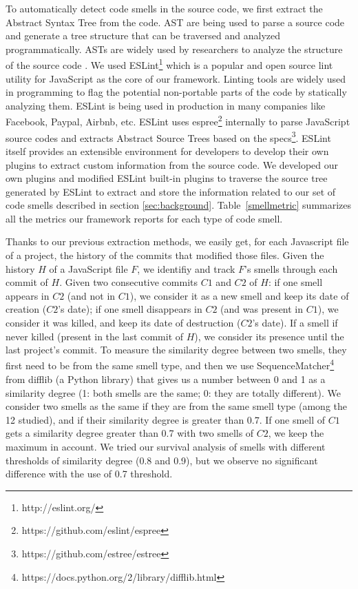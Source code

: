  To automatically detect code smells in the source code, we first extract the Abstract Syntax Tree from the code. AST are being used to parse a source code and generate a tree structure that can be traversed and analyzed programmatically. ASTs are widely used by researchers to analyze the structure of the source code \cite{neamtiu2005understanding, baxter1998clone, pfenning1988higher}.
We used ESLint\footnote{http://eslint.org/} which is a popular and open source lint utility for JavaScript as the core of our framework. Linting tools are widely used in programming to flag the potential non-portable parts of the code by statically analyzing them. ESLint is being used in production in many companies like Facebook, Paypal, Airbnb, etc. ESLint uses espree\footnote{https://github.com/eslint/espree} internally to parse JavaScript source codes and extracts Abstract Source Trees based on the specs\footnote{https://github.com/estree/estree}. ESLint itself provides an extensible environment for developers to develop their own plugins to extract custom information from the source code. We developed our own plugins and modified ESLint built-in plugins to traverse the source tree generated by ESLint to extract and store the information related to our set of code smells described in section \ref{sec:background}. Table~\ref{smellmetric} summarizes all the metrics our framework reports for each type of code smell.

{\color{blue}
 Thanks to our previous extraction methods, we easily get, for each Javascript file of a project, the history of the commits that modified those files. Given the history $H$ of a JavaScript file $F$, we identifiy and track $F$'s smells through each commit of $H$. Given two consecutive commits $C1$ and $C2$ of $H$: if one smell appears in $C2$ (and not in $C1$), we consider it as a new smell and keep its date of creation ($C2$'s date); if one smell disappears in $C2$ (and was present in $C1$), we consider it was killed, and keep its date of destruction ($C2$'s date). If a smell if never killed (present in the last commit of $H$), we consider its presence until the last project's commit. To measure the similarity degree between two smells, they first need to be from the same smell type, and then we use SequenceMatcher\footnote{https://docs.python.org/2/library/difflib.html} from difflib (a Python library) that gives us a number between 0 and 1 as a similarity degree (1: both smells are the same; 0: they are totally different). We consider two smells as the same if they are from the same smell type (among the 12 studied), and if their similarity degree is greater than 0.7. If one smell of $C1$ gets a similarity degree greater than 0.7 with two smells of $C2$, we keep the maximum in account. We tried our survival analysis of smells with different thresholds of similarity degree (0.8 and 0.9), but we observe no significant difference with the use of 0.7 threshold.
}

